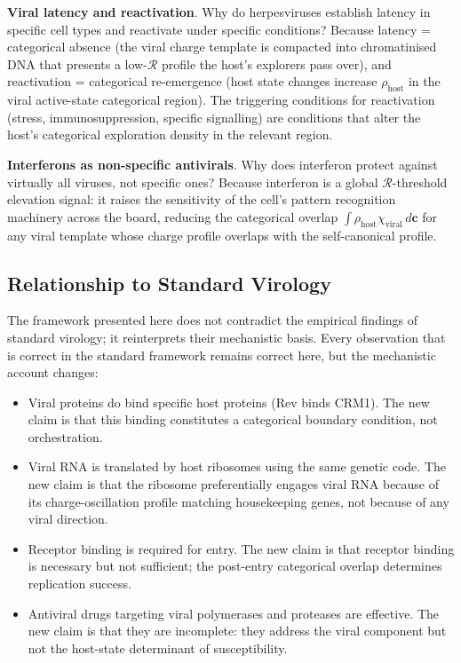 \documentclass[11pt,twocolumn,a4paper]{article}
\theoremstyle{definition}
\theoremstyle{remark}
\newcommand{\Rcat}{\mathcal{R}}
\newcommand{\Phost}{\rho_{\mathrm{host}}}
\newcommand{\chiviral}{\chi_{\mathrm{viral}}}
\newcommand{\vv}[1]{\boldsymbol{#1}}
\begin{document}
\textbf{Viral latency and reactivation}. Why do herpesviruses establish latency in specific cell types and reactivate under specific conditions? Because latency = categorical absence (the viral charge template is compacted into chromatinised DNA that presents a low-$\Rcat$ profile the host's explorers pass over), and reactivation = categorical re-emergence (host state changes increase $\Phost$ in the viral active-state categorical region). The triggering conditions for reactivation (stress, immunosuppression, specific signalling) are conditions that alter the host's categorical exploration density in the relevant region.

\textbf{Interferons as non-specific antivirals}. Why does interferon protect against virtually all viruses, not specific ones? Because interferon is a global $\Rcat$-threshold elevation signal: it raises the sensitivity of the cell's pattern recognition machinery across the board, reducing the categorical overlap $\int \Phost \chiviral\,d\vv{c}$ for any viral template whose charge profile overlaps with the self-canonical profile.

\subsection{Relationship to Standard Virology}

The framework presented here does not contradict the empirical findings of standard virology; it reinterprets their mechanistic basis. Every observation that is correct in the standard framework remains correct here, but the mechanistic account changes:

\begin{itemize}
  \item Viral proteins do bind specific host proteins (Rev binds CRM1). The new claim is that this binding constitutes a categorical boundary condition, not orchestration.
  \item Viral RNA is translated by host ribosomes using the same genetic code. The new claim is that the ribosome preferentially engages viral RNA because of its charge-oscillation profile matching housekeeping genes, not because of any viral direction.
  \item Receptor binding is required for entry. The new claim is that receptor binding is necessary but not sufficient; the post-entry categorical overlap determines replication success.
  \item Antiviral drugs targeting viral polymerases and proteases are effective. The new claim is that they are incomplete: they address the viral component but not the host-state determinant of susceptibility.
\end{itemize}
\end{document}
